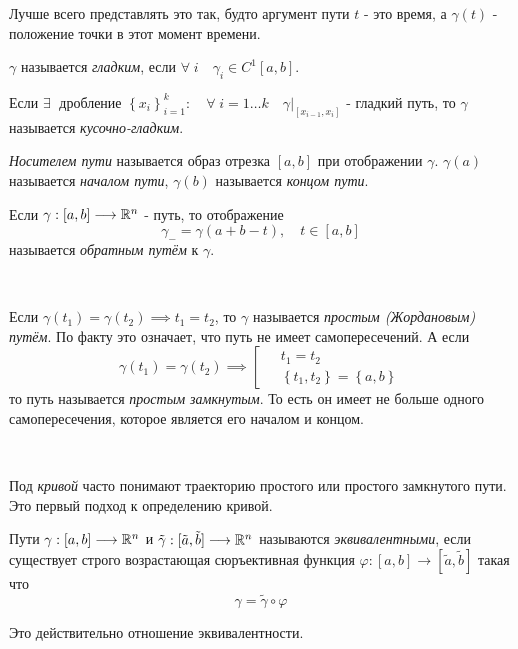 \documentclass[../main.tex]{subfiles}
\begin{document}
Лучше всего представлять это так, будто аргумент пути \( t\) - это время, а \( \gamma \left( t\right)\) - положение точки в этот момент времени. 

\( \gamma \) называется \emph{гладким}, если \( \forall \;i\quad \gamma _i \in C^1\left[ a,b\right]\). 

Если \( \exists \; \) дробление \( \left\{ x_i\right\}_{i=1}^k:\quad \forall \;i=1\dots k\quad \gamma |_{\left[ x_{i-1}, x_i\right]}\) - гладкий путь, то 
\( \gamma \) называется \emph{кусочно-гладким}.


\emph{Носителем пути} называется образ отрезка \( \left[ a,b\right]\) при отображении \( \gamma \).
\( \gamma \left( a\right)\) называется \emph{началом пути}, \( \gamma \left( b\right)\) называется \emph{концом пути}. 

Если \( \gamma :\left[ a,b\right] \longrightarrow \mathbb{R} ^n\) - путь, то отображение \[ \gamma _-= \gamma \left( a+b-t\right),\quad t \in \left[ a,b\right]\]
называется \emph{обратным путём} к \( \gamma \). 

~

Если \( \gamma \left( t_1\right)= \gamma \left( t_2\right) \implies t_1=t_2\), то \( \gamma \) называется \emph{простым (Жордановым) путём}. По факту это означает, что 
путь не имеет самопересечений. А если 
\begin{equation*}
    \gamma \left( t_1\right)= \gamma \left( t_2\right) \implies 
    \left[
    \begin{aligned}
        &\;t_1=t_2\\ 
        &\;\left\{ t_1,t_2\right\}=\left\{ a,b\right\}
    \end{aligned}
    \right.
\end{equation*}
то путь называется \emph{простым замкнутым}. То есть он имеет не больше одного самопересечения, которое является его началом и концом. 

~

Под \emph{кривой} часто понимают траекторию простого или простого замкнутого пути. Это первый подход к определению кривой.

Пути \( \gamma : \left[ a,b\right] \longrightarrow \mathbb{R} ^n\) и \( \tilde{ \gamma }: [ \tilde{a}, \tilde{b}] \longrightarrow \mathbb{R} ^n\) называются 
\emph{эквивалентными}, если существует строго возрастающая сюръективная функция \( \varphi :\left[ a,b\right] \longrightarrow [ \tilde{a}, \tilde{b}]\) такая что 
\[ \gamma = \tilde{ \gamma } \circ \varphi \]

\begin{note}
    Это действительно отношение эквивалентности.
\end{note}
\end{document}
